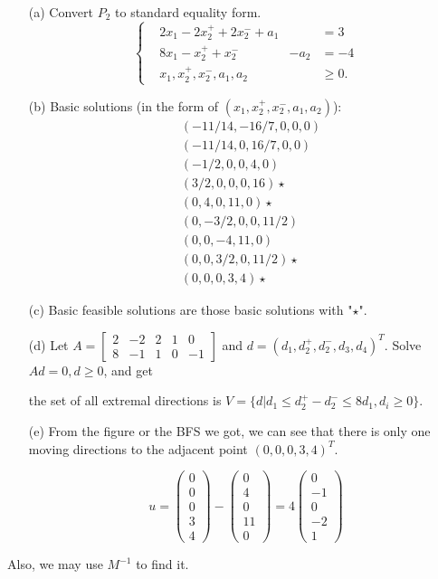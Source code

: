 \documentclass[12pt]{article}
\begin{document}
\begin{enumerate}
\item [(a)]
Convert $P_2$ to standard equality form.
$$
\left\{
\begin{aligned}
& 2x_1 - 2x_2^+ + 2x_2^- + a_1 & & = 3 \\
& 8x_1 - x_2^+ + x_2^-   & -a_2 & = -4 \\
& x_1, x_2^+, x_2^-, a_1, a_2 & & \geqslant 0.
\end{aligned}
\right.
$$

\item[(b)]
Basic solutions (in the form of $(x_1, x_2^+, x_2^-, a_1, a_2)$): 
$$
\begin{aligned}
&(-11/14, -16/7, 0, 0, 0)   \\ 
&(-11/14, 0, 16/7, 0, 0) \\ 
&(-1/2, 0, 0, 4, 0) \\
& (3/2, 0, 0, 0, 16) \star \\ 
 &(0, 4, 0, 11, 0) \star \\
 & (0, -3/2, 0, 0, 11/2) \\
 & (0, 0, -4, 11, 0) \\
& (0, 0, 3/2, 0, 11/2) \star \\
& (0, 0, 0, 3, 4) \star
\end{aligned}
$$

\item[(c)]
Basic feasible solutions are those basic solutions with "$\star$".

\item[(d)]
Let $A = \begin{bmatrix}
2 & -2 & 2 & 1 & 0 \\
8 & -1 & 1 & 0 & -1
\end{bmatrix}$ and $d = (d_1, d_2^+, d_2^-, d_3, d_4)^T$. Solve $Ad =0, d\geqslant 0$, and get

the set of all extremal directions is $V = \{d |  d_1 \leqslant d_2^+ - d_2^-  \leqslant 8d_1, d_i \geqslant 0 \}$.


\item[(e)]
From the figure or the BFS we got, we can see that there is only one moving directions to the adjacent point $(0, 0, 0, 3, 4)^T$. 

$$
u = \begin{pmatrix}
0\\
 0\\
 0\\
 3 \\
 4
\end{pmatrix} - \begin{pmatrix}
0\\
4\\
0 \\
11 \\
0
\end{pmatrix} = 4 \begin{pmatrix}
0 \\
-1 \\
0 \\
-2 \\
1
\end{pmatrix} 
$$
\end{enumerate}

Also, we may use $M^{-1}$ to find it.
\end{document}
